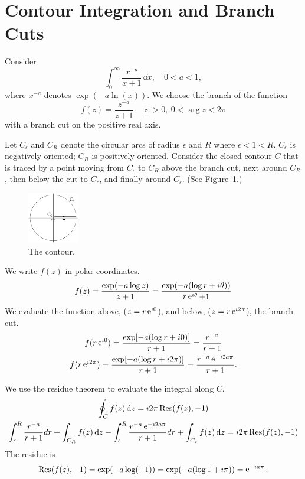 \section{Contour Integration and Branch Cuts}






\begin{Example}
  Consider
  \[
  \int_0^\infty \frac{x^{-a}}{x+1} \,\dd x, \quad 0<a<1,
  \]
  where $x^{-a}$ denotes $\exp( -a \ln(x))$.
  We choose the branch of the function
  \[
  f(z) = \frac{z^{-a}}{z+1} \quad |z| > 0,\ 0< \arg z < 2\pi
  \]
  with a branch cut on the positive real axis.

  Let $C_\epsilon$ and $C_R$ denote the circular arcs of radius $\epsilon$ and $R$ 
  where $\epsilon < 1 < R$.  $C_\epsilon$ is negatively oriented; 
  $C_R$ is positively oriented.
  Consider the closed contour $C$ that is traced by a point moving from
  $C_\epsilon$ to $C_R$ above the branch cut, next around $C_R$, then
  below the cut to $C_\epsilon$, and finally around $C_\epsilon$.
  (See Figure~\ref{contepsr x-a x+1}.)
  \begin{figure}[tb!]
    \begin{center}
      \includegraphics[width=0.2\textwidth]{fcv/residue/contepsr}
    \end{center}
    \caption{The contour.}
    \label{contepsr x-a x+1}
  \end{figure}

  We write $f(z)$ in polar coordinates.
  \[
  f(z) = \frac{\exp(-a \log z)}{z+1} =
  \frac{\exp(-a(\log r + i\theta))}{r\mathop{\mathrm{e}}\nolimits^{\imath \theta} + 1} 
  \]
  We evaluate the function above, ($z = r \mathop{\mathrm{e}}\nolimits^{\imath 0}$), and below, ($z = r \mathop{\mathrm{e}}\nolimits^{\imath 2 \pi}$),
  the branch cut.
  \begin{gather*}
    f(r \mathop{\mathrm{e}}\nolimits^{\imath 0}) = \frac{\exp[-a(\log r + i0)]}{r+1} = \frac{r^{-a}}{r+1} \\
    f(r \mathop{\mathrm{e}}\nolimits^{\imath 2 \pi}) = \frac{\exp[-a(\log r + \imath 2\pi)]}{r+1} = \frac{r^{-a}\mathop{\mathrm{e}}\nolimits^{-\imath 2a\pi}}{r+1}.
  \end{gather*}

  We use the residue theorem to evaluate the integral along $C$.
  \begin{gather*}
    \oint_C f(z) \,\mathrm{d} z = \imath 2 \pi \mathop{\mathrm{Res}}\nolimits( f(z), -1 ) \\
    \int_\epsilon^R \frac{r^{-a}}{r+1}dr + \int_{C_R} f(z)\,\mathrm{d} z -
    \int_\epsilon^R \frac{r^{-a}\mathop{\mathrm{e}}\nolimits^{-\imath 2 a \pi}}{r+1} dr 
    + \int_{C_\epsilon} f(z)\,\mathrm{d} z =
    \imath 2 \pi \mathop{\mathrm{Res}}\nolimits( f(z), -1)
  \end{gather*}
  The residue is
  \[ 
  \mathop{\mathrm{Res}}\nolimits( f(z), -1) = \exp(-a \log (-1)) = \exp(-a (\log 1 + \imath \pi)) = \mathop{\mathrm{e}}\nolimits^{- \imath a \pi}.
  \]


\end{Example}
